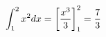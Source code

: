 \documentclass[preview]{standalone}
\begin{document}
\begin{align*}
\special{dvisvgm:raw <g id='unique000'>}\int_1^2 x^2 dx = \left[\frac{x^3}{3}\right]_1^2 = \frac{7}{3}\special{dvisvgm:raw </g>}
\end{align*}
\end{document}
